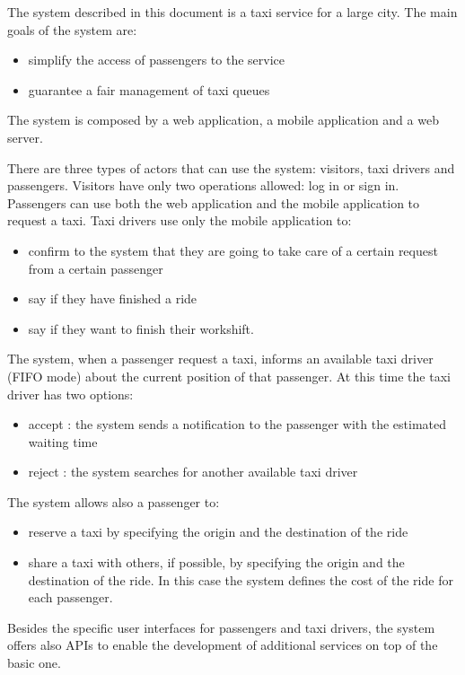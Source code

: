 The system described in this document is a taxi service for a large city.
The main goals of the system are: 
\begin{itemize} 
	\item simplify the access of passengers to the service
	\item guarantee a fair management of taxi queues
\end{itemize}
The system is composed by a web application, a mobile application and a web server.

There are three types of actors that can use the system: visitors, taxi drivers and passengers.
Visitors have only two operations allowed: log in or sign in.
Passengers can use both the web application and the mobile application to request a taxi.
Taxi drivers use only the mobile application to:
\begin{itemize}
	\item confirm to the system that they are going to take care of a certain request from a certain passenger
	\item say if they have finished a ride 
	\item say if they want to finish their workshift.
\end{itemize}

The system, when a passenger request a taxi, informs an available taxi driver (FIFO mode) about the current position of that passenger. 
At this time the taxi driver has two options:
\begin{itemize}
\item accept : the system sends a notification to the passenger with the estimated waiting time
\item reject : the system searches for another available taxi driver
\end{itemize}

The system allows also a passenger to:
\begin{itemize}
\item reserve a taxi by specifying the origin and the destination of the ride
\item share a taxi with others, if possible, by specifying the origin and the destination of the ride. In this case the system defines the cost of the ride for each passenger.
\end{itemize}

Besides the specific user interfaces for passengers and taxi drivers, the system offers also APIs to enable the development of additional services on top of the basic one.
